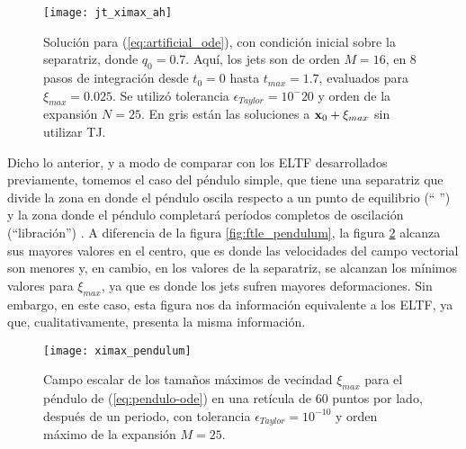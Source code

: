 \begin{figure}[h!]
 \centering
 \texttt{[image: jt\_ximax\_ah]}
 \caption{Solución para (\ref{eq:artificial_ode}), con condición inicial sobre la separatriz, donde $q_0 = 0.7$. Aquí, los jets son de orden $M=16$, en $8$ pasos de integración desde $t_0 = 0$ hasta $t_{max} = 1.7$, evaluados para $\xi_{max} = 0.025$. Se utilizó tolerancia $\epsilon_{Taylor} = 10^-{20}$ y orden de la expansión $N=25$. En gris están las soluciones a $\mathbf{x}_0 + \xi_{max}$ sin utilizar TJ.}
 \label{fig:jt_ximax_ah}
\end{figure}

Dicho lo anterior, y a modo de comparar con los ELTF desarrollados previamente, tomemos el caso del péndulo simple, que tiene una separatriz que divide la zona en donde el péndulo oscila respecto a un punto de equilibrio (`` '') y la zona donde el péndulo completará períodos completos de oscilación (``libración'') . A diferencia de la figura \ref{fig:ftle_pendulum}, la figura \ref{fig:ximax_pendulum} alcanza sus mayores valores en el centro, que es donde las velocidades del campo vectorial son menores y, en cambio, en los valores de la separatriz, se alcanzan los mínimos valores para $\xi_{max}$, ya que es donde los jets sufren mayores deformaciones. Sin embargo, en este caso, esta figura nos da información equivalente a los ELTF, ya que, cualitativamente, presenta la misma información. 

\begin{figure}[h!]
 \centering
 \texttt{[image: ximax\_pendulum]}
 \caption{Campo escalar de los tamaños máximos de vecindad $\xi_{max}$ para el péndulo de (\ref{eq:pendulo-ode}) en una retícula de $60$ puntos por lado, después de un periodo, con tolerancia $\epsilon_{Taylor} = 10^{-10}$ y orden máximo de la expansión $M = 25$.}
 \label{fig:ximax_pendulum}
\end{figure}

